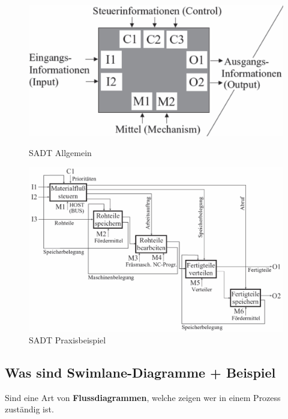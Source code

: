 \begin{figure}[H]
    \centering
    \begin{minipage}[t]{0.45\textwidth}  %
        \centering
        \includegraphics[width=\linewidth]{Bilder/Teil1_SADT_Allgemein.png} %
        \caption{SADT Allgemein}
    \end{minipage} \hfill
    \begin{minipage}[t]{0.45\textwidth}  %
        \centering
        \includegraphics[width=\linewidth]{Bilder/Teil1_SADT_Beispiel.png} %
        \caption{SADT Praxisbeispiel}
    \end{minipage}
\end{figure}


\subsection{Was sind Swimlane-Diagramme + Beispiel}
Sind eine Art von \textbf{Flussdiagrammen}, welche zeigen wer in einem Prozess zuständig ist.

